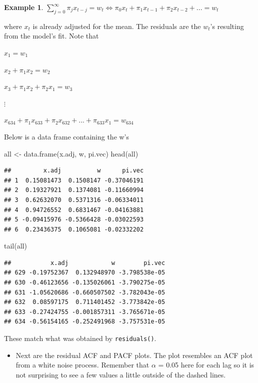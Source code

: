 \documentclass[
]{book}
\newenvironment{Shaded}{\begin{snugshade}}{\end{snugshade}}
\newcommand{\FunctionTok}[1]{\textcolor[rgb]{0.00,0.00,0.00}{#1}}
\newcommand{\NormalTok}[1]{#1}
\newcommand{\OtherTok}[1]{\textcolor[rgb]{0.56,0.35,0.01}{#1}}
\providecommand{\tightlist}{%
  \setlength{\itemsep}{0pt}\setlength{\parskip}{0pt}}
\theoremstyle{definition}
\theoremstyle{definition}
\newtheorem{example}{Example}[chapter]
\theoremstyle{definition}
\theoremstyle{definition}
\theoremstyle{remark}
\begin{document}
\begin{example}
\(\sum_{j=0}^{\infty}\pi_jx_{t-j}=w_t\iff\pi_0x_t+\pi_1x_{t-1}+\pi_2x_{t-2}+...=w_t\)

where \(x_t\) is already adjusted for the mean. The residuals are the \(w_t\)'s resulting from the model's fit. Note that

\(x_1=w_1\)

\(x_2+\pi_1x_2=w_2\)

\(x_3+\pi_1x_2+\pi_2x_1=w_3\)

\(\vdots\)

\(x_{634}+\pi_1x_{633}+\pi_2x_{632}+...+\pi_{633}x_1=w_{634}\)

Below is a data frame containing the w's

\begin{Shaded}
\begin{Highlighting}[]
\NormalTok{all }\OtherTok{\textless{}{-}} \FunctionTok{data.frame}\NormalTok{(x.adj, w, pi.vec)}
\FunctionTok{head}\NormalTok{(all)}
\end{Highlighting}
\end{Shaded}

\begin{verbatim}
##         x.adj          w      pi.vec
## 1  0.15081473  0.1508147 -0.37046191
## 2  0.19327921  0.1374081 -0.11660994
## 3  0.62632070  0.5371316 -0.06334011
## 4  0.94726552  0.6831467 -0.04163881
## 5 -0.09415976 -0.5366428 -0.03022593
## 6  0.23436375  0.1065081 -0.02332202
\end{verbatim}

\begin{Shaded}
\begin{Highlighting}[]
\FunctionTok{tail}\NormalTok{(all)}
\end{Highlighting}
\end{Shaded}

\begin{verbatim}
##           x.adj            w        pi.vec
## 629 -0.19752367  0.132948970 -3.798538e-05
## 630 -0.46123656 -0.135026061 -3.790275e-05
## 631 -1.05620686 -0.660507502 -3.782043e-05
## 632  0.08597175  0.711401452 -3.773842e-05
## 633 -0.27424755 -0.001857311 -3.765671e-05
## 634 -0.56154165 -0.252491968 -3.757531e-05
\end{verbatim}

These match what was obtained by \texttt{residuals()}.

\begin{itemize}
\tightlist
\item
  Next are the residual ACF and PACF plots. The plot resembles an ACF plot from a white noise process. Remember that \(\alpha\) = 0.05 here for each lag so it is not surprising to see a few values a little outside of the dashed lines.
\end{itemize}


\end{example}
\end{document}
